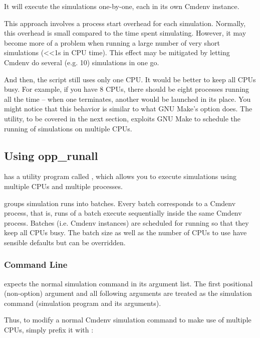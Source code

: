 It will execute the simulations one-by-one, each in its own Cmdenv instance.

This approach involves a process start overhead for each simulation.
Normally, this overhead is small compared to the time spent simulating. However,
it may become more of a problem when running a large number of very short
simulations (<<1s in CPU time). This effect may be mitigated by letting Cmdenv
do several (e.g. 10) simulations in one go.

And then, the script still uses only one CPU. It would be better to keep
all CPUs busy. For example, if you have 8 CPUs, there should be eight processes
running all the time -- when one terminates, another would be launched in its place.
You might notice that this behavior is similar to what GNU Make's
 option does. The  utility, to be covered
in the next section, exploits GNU Make to schedule the running of simulations on
multiple CPUs.


\subsection{Using opp\_runall}
\label{sec:run-sim:batches-using-opp-runall}

{\opp} has a utility program called , which allows you to
execute simulations using multiple CPUs and multiple processes.

 groups simulation runs into batches. Every batch
corresponds to a Cmdenv process, that is, runs of a batch execute sequentially
inside the same Cmdenv process. Batches (i.e. Cmdenv instances) are scheduled
for running so that they keep all CPUs busy. The batch size as well as the
number of CPUs to use have sensible defaults but can be overridden.

\subsubsection{Command Line}
\label{sec:run-sim:opp-runall:comandline}

 expects the normal simulation command in its argument list.
The first positional (non-option) argument and all following arguments are
treated as the simulation command (simulation program and its arguments).

Thus, to modify a normal Cmdenv simulation command to make use of multiple
CPUs, simply prefix it with :

